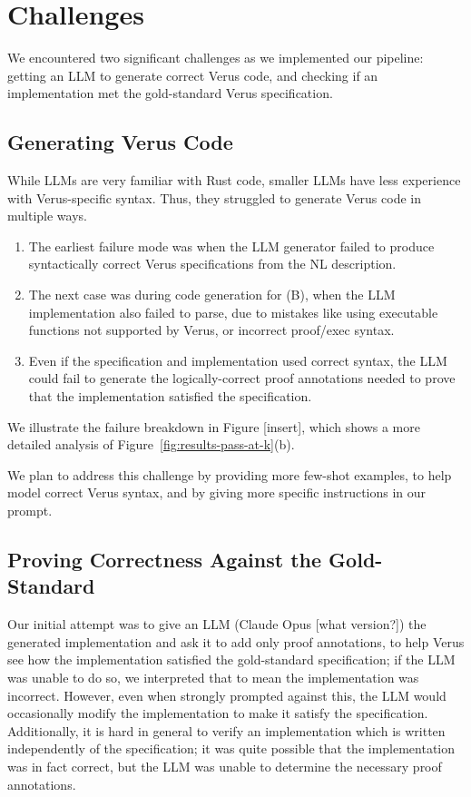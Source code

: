 \section{Challenges}
\label{challenges}

We encountered two significant challenges as we implemented our pipeline:
getting an LLM to generate correct Verus code, 
and checking if an implementation met the gold-standard Verus specification. 

\subsection{Generating Verus Code}

While LLMs are very familiar with Rust code, 
smaller LLMs have less experience with Verus-specific syntax.
Thus, they struggled to generate Verus code in multiple ways.
\begin{enumerate}
    \item The earliest failure mode was when
    the LLM generator failed to produce syntactically correct 
    Verus specifications from the NL description.
    \item The next case was during code generation for (B), 
    when the LLM implementation also failed to parse, 
    due to mistakes like using executable functions not supported by Verus,
    or incorrect proof/exec syntax.
    \item Even if the specification and implementation used correct syntax,
    the LLM could fail to generate the logically-correct proof annotations 
    needed to prove that the implementation satisfied the specification.
\end{enumerate}
We illustrate the failure breakdown in Figure [insert], 
which shows a more detailed analysis of Figure~\ref{fig:results-pass-at-k}(b).

We plan to address this challenge by providing more few-shot examples,
to help model correct Verus syntax,
and by giving more specific instructions in our prompt.

\subsection{Proving Correctness Against the Gold-Standard}

Our initial attempt was to give an LLM (Claude Opus [what version?]) 
the generated implementation and ask it to add only proof annotations, 
to help Verus see how the implementation satisfied the gold-standard specification;
if the LLM was unable to do so, we interpreted that to mean the implementation was incorrect.
However, even when strongly prompted against this, 
the LLM would occasionally modify the implementation to make it satisfy the specification.
Additionally, it is hard in general to verify an implementation which is written independently of the specification;
it was quite possible that the implementation was in fact correct, 
but the LLM was unable to determine the necessary proof annotations. 

